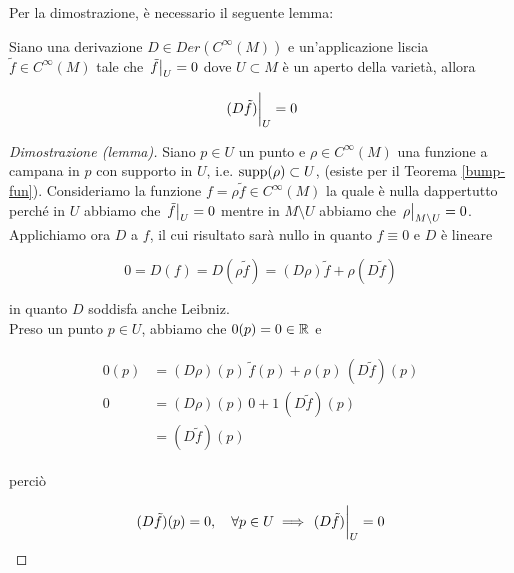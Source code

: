 Per la dimostrazione, è necessario il seguente lemma:

\begin{lemma}
	Siano una derivazione $ D \in Der(C^{\infty}(M)) $ e un'applicazione liscia $ \tilde{f} \in C^{\infty}(M) $ tale che $ \eval{\tilde{f}}_{U} = 0 $ dove $ U \subset M $ è un aperto della varietà, allora
	
	\begin{equation}
		\eval{(D \tilde{f})}_{U} = 0
	\end{equation}
\end{lemma}

\begin{proof}[Dimostrazione (lemma)]
	Siano $ p \in U $ un punto e $ \rho \in C^{\infty}(M) $ una funzione a campana in $ p $ con supporto in $ U $, i.e. $ \operatorname{supp}(\rho) \subset U $, (esiste per il Teorema \ref{bump-fun}). Consideriamo la funzione $ f = \rho \tilde{f} \in C^{\infty}(M) $ la quale è nulla dappertutto perché in $ U $ abbiamo che $ \eval{\tilde{f}}_{U} = 0 $ mentre in $ M \setminus U $ abbiamo che $ \eval{\rho}_{M \setminus U} = 0 $. Applichiamo ora $ D $ a $ f $, il cui risultato sarà nullo in quanto $ f \equiv 0 $ e $ D $ è lineare
	
	\begin{equation}
		0 = D(f) %
		= D (\rho \tilde{f}) %
		= (D \rho) \tilde{f} + \rho (D \tilde{f})
	\end{equation}

	in quanto $ D $ soddisfa anche Leibniz.\\
	Preso un punto $ p \in U $, abbiamo che $ 0(p) = 0 \in \mathbb{R} $ e
	
	\begin{align}
		\begin{split}
			0(p) &= (D \rho)(p) \, \tilde{f}(p) + \rho(p) \, (D \tilde{f})(p)\\
			0 &= (D \rho)(p) \, 0 + 1 \, (D \tilde{f})(p)\\
			&= (D \tilde{f})(p)
		\end{split}
	\end{align}

	perciò
	
	\begin{equation}
		(D \tilde{f})(p) = 0 \qcomma \forall p \in U \implies \eval{(D \tilde{f})}_{U} = 0
	\end{equation}
\end{proof}

